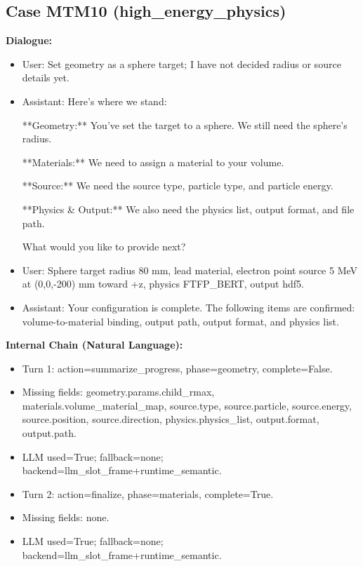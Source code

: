 \documentclass[11pt]{ctexart}
\begin{document}
\subsection{Case MTM10 (high\_energy\_physics)}
\textbf{Dialogue:}
\begin{itemize}
\item User: Set geometry as a sphere target; I have not decided radius or source details yet.
\item Assistant: Here's where we stand:

**Geometry:** You've set the target to a sphere. We still need the sphere's radius.

**Materials:** We need to assign a material to your volume.

**Source:** We need the source type, particle type, and particle energy.

**Physics \& Output:** We also need the physics list, output format, and file path.

What would you like to provide next?
\item User: Sphere target radius 80 mm, lead material, electron point source 5 MeV at (0,0,-200) mm toward +z, physics FTFP\_BERT, output hdf5.
\item Assistant: Your configuration is complete. The following items are confirmed: volume-to-material binding, output path, output format, and physics list.
\end{itemize}
\textbf{Internal Chain (Natural Language):}
\begin{itemize}
\item Turn 1: action=summarize\_progress, phase=geometry, complete=False.
\item Missing fields: geometry.params.child\_rmax, materials.volume\_material\_map, source.type, source.particle, source.energy, source.position, source.direction, physics.physics\_list, output.format, output.path.
\item LLM used=True; fallback=none; backend=llm\_slot\_frame+runtime\_semantic.
\item Turn 2: action=finalize, phase=materials, complete=True.
\item Missing fields: none.
\item LLM used=True; fallback=none; backend=llm\_slot\_frame+runtime\_semantic.
\end{itemize}
\end{document}
